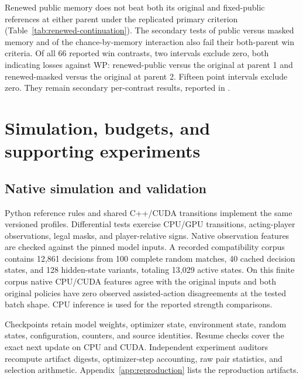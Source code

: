 \documentclass[11pt]{article}
\begin{document}
Renewed public memory does not beat both its original and fixed-public
references at either parent under the replicated primary criterion
(Table~\ref{tab:renewed-continuation}). The secondary tests of public versus
masked memory and of the chance-by-memory interaction also fail their
both-parent win criteria. Of all 66 reported win contrasts, two intervals
exclude zero, both indicating losses against WP: renewed-public versus the
original at parent 1 and renewed-masked versus the original at parent 2.
Fifteen point intervals exclude zero. They remain secondary per-contrast
results, reported in .

\begin{table}[ht]
\centering\small

\caption{Renewed-public policy minus its two primary references in the equal
WP/Point mixture. Brackets give stratified paired 95\% intervals. Every primary
win interval includes zero; the study does not qualify for final confirmation.}
\label{tab:renewed-continuation}
\end{table}

\section{Simulation, budgets, and supporting experiments}
\label{app:systems}
\subsection{Native simulation and validation}
Python reference rules and shared C++/CUDA transitions implement the same
versioned profiles. Differential tests exercise CPU/GPU transitions, acting-player
observations, legal masks, and player-relative signs. Native observation features
are checked against the pinned model inputs. A recorded compatibility corpus
contains 12,861 decisions from 100 complete random matches, 40 cached decision
states, and 128 hidden-state variants, totaling 13,029 active states. On this
finite corpus native CPU/CUDA features agree with the original inputs and
both original policies have zero observed assisted-action disagreements at
the tested batch shape. CPU inference is used for the reported strength comparisons.

Checkpoints retain model weights, optimizer state, environment state, random
states, configuration, counters, and source identities. Resume checks cover
the exact next update on CPU and CUDA. Independent experiment auditors
recompute artifact digests, optimizer-step accounting, raw pair statistics,
and selection arithmetic. Appendix~\ref{app:reproduction} lists the reproduction artifacts.
\end{document}
